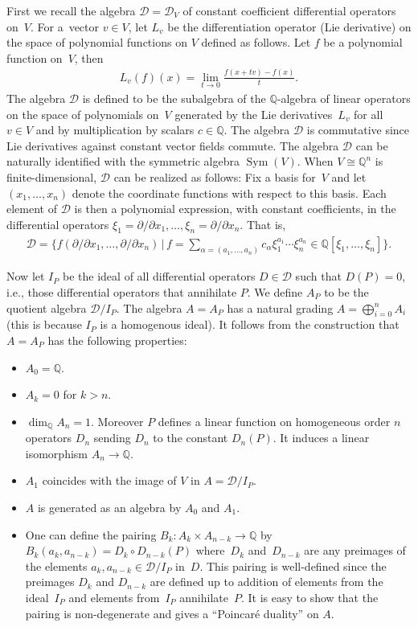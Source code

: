 \documentclass[10pt,a4paper]{amsart}
\def \Q{\mathbb{Q}}
\def \D{\mathcal{D}}
\def \Sym{\operatorname{Sym}}
\numberwithin{equation}{section}
\theoremstyle{definition}
\begin{document}
First we recall the algebra $\D = \D_V$ of constant coefficient differential operators on~$V$. For a~vector $v \in V$, let $L_v$ be the differentiation operator (Lie derivative) on the space of polynomial functions on $V$ defined as follows. Let $f$ be a polynomial function on~$V$, then
\begin{gather*} L_v(f)(x) = \lim_{t \to 0} \frac{f(x+tv) - f(x)}{t}.\end{gather*}
The algebra $\D$ is defined to be the subalgebra of the $\Q$-algebra of linear operators on the space of polynomials on~$V$ generated by the Lie derivatives~$L_v$ for all $v \in V$ and by multiplication by scalars $c \in \Q$. The algebra $\D$ is commutative since Lie derivatives against constant vector fields commute. The algebra $\D$ can be naturally identified with the symmetric algebra $\Sym(V)$. When $V \cong \Q^n$ is finite-dimensional, $\D$ can be realized as follows: Fix a basis for~$V$ and let $(x_1, \ldots, x_n)$ denote the coordinate functions with respect to this basis. Each element of $\D$ is then a polynomial expression, with constant coefficients, in the differential operators $\xi_1=\partial/\partial x_1, \ldots,\xi_n= \partial/\partial x_n$. That is,
\begin{gather*} \D =\bigg\{ f(\partial/\partial x_1, \ldots, \partial/\partial x_n) \,|\, f = \sum_{\alpha = (a_1, \ldots, a_n)} c_\alpha \xi_1^{a_1} \cdots \xi_n^{a_n} \in \Q[\xi_1, \ldots, \xi_n]\bigg\}.
\end{gather*}

Now let $I_P$ be the ideal of all differential operators $D \in \D$ such that $D (P) = 0$, i.e., those differential operators that annihilate $P$. We define $A_P$ to be the quotient algebra $\D / I_P$.
The algebra $A = A_P$ has a natural grading $A= \bigoplus_{i=0}^n A_i$ (this is because $I_P$ is a homogenous ideal). It follows from the construction that $A = A_P$ has the following properties:
\begin{itemize}\itemsep=0pt
\item $A_0=\Q$.
\item $A_k=0$ for $k>n$.
\item $\dim _{\Q}A_n=1$. Moreover $P$ defines a linear function on homogeneous order $n$ operators $D_n$ sending $D_n$ to the constant $D_n(P)$. It induces a linear isomorphism $A_n \to \Q$.
\item $A_1$ coincides with the image of $V$ in $A=\D / I_P$.
\item $A$ is generated as an algebra by $A_0$ and $A_1$.
\item One can define the pairing $B_k\colon A_k\times A_{n-k}\rightarrow \Q$ by $B_k(a_k, a_{n-k}) = D_k \circ D_{n-k}(P)$ where~$D_k$ and~$D_{n-k}$ are any preimages of the elements $a_k,a_{n-k}\in \D/I_P$ in~$D$. This pairing is well-defined since the preimages $D_k$ and $D_{n-k}$ are defined up to addition of elements from the ideal~$I_P$ and elements from~$I_P$ annihilate~$P$. It is easy to show that the pairing is non-degenerate and gives a ``Poincar\'e duality'' on $A$.
\end{itemize}
\end{document}
